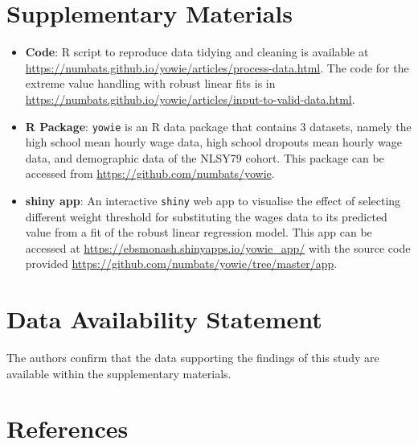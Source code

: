 \documentclass[12pt]{article}
\begin{document}
\hypertarget{supplementary-materials}{%
\section{Supplementary Materials}\label{supplementary-materials}}

\begin{itemize}
\item
  \textbf{Code}: R script to reproduce data tidying and cleaning is available at \url{https://numbats.github.io/yowie/articles/process-data.html}. The code for the extreme value handling with robust linear fits is in \url{https://numbats.github.io/yowie/articles/input-to-valid-data.html}.
\item
  \textbf{R Package}: \texttt{yowie} is an R data package that contains 3 datasets, namely the high school mean hourly wage data, high school dropouts mean hourly wage data, and demographic data of the NLSY79 cohort. This package can be accessed from \url{https://github.com/numbats/yowie}.
\item
  \textbf{shiny app}: An interactive \texttt{shiny} web app to visualise the effect of selecting different weight threshold for substituting the wages data to its predicted value from a fit of the robust linear regression model. This app can be accessed at \url{https://ebsmonash.shinyapps.io/yowie_app/} with the source code provided \url{https://github.com/numbats/yowie/tree/master/app}.
\end{itemize}

\hypertarget{data-availability-statement}{%
\section{Data Availability Statement}\label{data-availability-statement}}

The authors confirm that the data supporting the findings of this study are available within the supplementary materials.

\hypertarget{references}{%
\section*{References}\label{references}}
\end{document}
